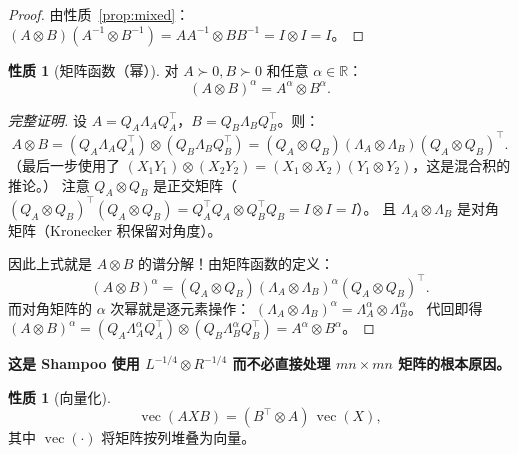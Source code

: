 \documentclass[12pt,a4paper]{ctexart}
\theoremstyle{definition}
\newtheorem{property}[theorem]{性质}
\theoremstyle{plain}
\newcommand{\R}{\mathbb{R}}
\newcommand{\vect}{\operatorname{vec}}
\begin{document}
\begin{proof}
  由性质~\ref{prop:mixed}：$(A\otimes B)(A^{-1}\otimes B^{-1}) = AA^{-1}\otimes BB^{-1} = I\otimes I = I$。
\end{proof}

\begin{property}[矩阵函数（幂）]
  对 $A\succ0,B\succ0$ 和任意 $\alpha\in\R$：
  \begin{equation}\label{eq:kron-pow}
    (A\otimes B)^\alpha = A^\alpha \otimes B^\alpha.
  \end{equation}
\end{property}

\begin{proof}[完整证明]
  设 $A=Q_A\Lambda_A Q_A^\top$，$B=Q_B\Lambda_B Q_B^\top$。则：
  \[
    A\otimes B = (Q_A\Lambda_A Q_A^\top)\otimes(Q_B\Lambda_B Q_B^\top)
    = (Q_A\otimes Q_B)(\Lambda_A\otimes\Lambda_B)(Q_A\otimes Q_B)^\top.
  \]
  （最后一步使用了 $(X_1 Y_1)\otimes(X_2 Y_2)=(X_1\otimes X_2)(Y_1\otimes Y_2)$，这是混合积的推论。）
  注意 $Q_A\otimes Q_B$ 是正交矩阵（$(Q_A\otimes Q_B)^\top(Q_A\otimes Q_B)=Q_A^\top Q_A\otimes Q_B^\top Q_B=I\otimes I=I$）。
  且 $\Lambda_A\otimes\Lambda_B$ 是对角矩阵（Kronecker 积保留对角度）。

  因此上式就是 $A\otimes B$ 的谱分解！由矩阵函数的定义：
  \[
    (A\otimes B)^\alpha = (Q_A\otimes Q_B)(\Lambda_A\otimes\Lambda_B)^\alpha(Q_A\otimes Q_B)^\top.
  \]
  而对角矩阵的 $\alpha$ 次幂就是逐元素操作：
  $(\Lambda_A\otimes\Lambda_B)^\alpha = \Lambda_A^\alpha\otimes\Lambda_B^\alpha$。
  代回即得 $(A\otimes B)^\alpha = (Q_A\Lambda_A^\alpha Q_A^\top)\otimes(Q_B\Lambda_B^\alpha Q_B^\top) = A^\alpha\otimes B^\alpha$。
\end{proof}

\textbf{这是 Shampoo 使用 $L^{-1/4}\otimes R^{-1/4}$ 而不必直接处理 $mn\times mn$ 矩阵的根本原因。}

\begin{property}[向量化]\label{prop:vec}
  \begin{equation}\label{eq:vec-kron}
    \vect(AXB) = (B^\top\otimes A)\,\vect(X),
  \end{equation}
  其中 $\vect(\cdot)$ 将矩阵按列堆叠为向量。
\end{property}
\end{document}
